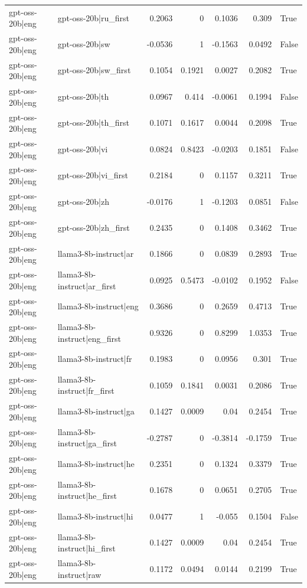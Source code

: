 \begin{table}
\begin{tabular}{l l r r r r l}
gpt-oss-20b|eng & gpt-oss-20b|ru_first & 0.2063 & 0 & 0.1036 & 0.309 & True \\
gpt-oss-20b|eng & gpt-oss-20b|sw & -0.0536 & 1 & -0.1563 & 0.0492 & False \\
gpt-oss-20b|eng & gpt-oss-20b|sw_first & 0.1054 & 0.1921 & 0.0027 & 0.2082 & True \\
gpt-oss-20b|eng & gpt-oss-20b|th & 0.0967 & 0.414 & -0.0061 & 0.1994 & False \\
gpt-oss-20b|eng & gpt-oss-20b|th_first & 0.1071 & 0.1617 & 0.0044 & 0.2098 & True \\
gpt-oss-20b|eng & gpt-oss-20b|vi & 0.0824 & 0.8423 & -0.0203 & 0.1851 & False \\
gpt-oss-20b|eng & gpt-oss-20b|vi_first & 0.2184 & 0 & 0.1157 & 0.3211 & True \\
gpt-oss-20b|eng & gpt-oss-20b|zh & -0.0176 & 1 & -0.1203 & 0.0851 & False \\
gpt-oss-20b|eng & gpt-oss-20b|zh_first & 0.2435 & 0 & 0.1408 & 0.3462 & True \\
gpt-oss-20b|eng & llama3-8b-instruct|ar & 0.1866 & 0 & 0.0839 & 0.2893 & True \\
gpt-oss-20b|eng & llama3-8b-instruct|ar_first & 0.0925 & 0.5473 & -0.0102 & 0.1952 & False \\
gpt-oss-20b|eng & llama3-8b-instruct|eng & 0.3686 & 0 & 0.2659 & 0.4713 & True \\
gpt-oss-20b|eng & llama3-8b-instruct|eng_first & 0.9326 & 0 & 0.8299 & 1.0353 & True \\
gpt-oss-20b|eng & llama3-8b-instruct|fr & 0.1983 & 0 & 0.0956 & 0.301 & True \\
gpt-oss-20b|eng & llama3-8b-instruct|fr_first & 0.1059 & 0.1841 & 0.0031 & 0.2086 & True \\
gpt-oss-20b|eng & llama3-8b-instruct|ga & 0.1427 & 0.0009 & 0.04 & 0.2454 & True \\
gpt-oss-20b|eng & llama3-8b-instruct|ga_first & -0.2787 & 0 & -0.3814 & -0.1759 & True \\
gpt-oss-20b|eng & llama3-8b-instruct|he & 0.2351 & 0 & 0.1324 & 0.3379 & True \\
gpt-oss-20b|eng & llama3-8b-instruct|he_first & 0.1678 & 0 & 0.0651 & 0.2705 & True \\
gpt-oss-20b|eng & llama3-8b-instruct|hi & 0.0477 & 1 & -0.055 & 0.1504 & False \\
gpt-oss-20b|eng & llama3-8b-instruct|hi_first & 0.1427 & 0.0009 & 0.04 & 0.2454 & True \\
gpt-oss-20b|eng & llama3-8b-instruct|raw & 0.1172 & 0.0494 & 0.0144 & 0.2199 & True \\

\end{tabular}
\end{table}
